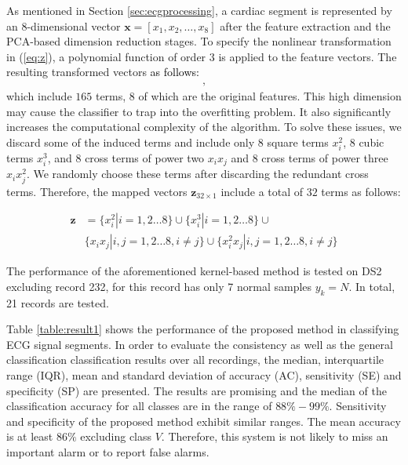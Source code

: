 As mentioned in Section \ref{sec:ecgprocessing}, a cardiac segment is represented by an 8-dimensional vector $\mathbf{x}=[x_1,x_2,\dots,x_8]$ after the feature extraction and the PCA-based dimension reduction stages. %
To specify the nonlinear transformation in (\ref{eq:z}), a polynomial function of order $3$ is applied to the feature vectors.
The resulting transformed vectors \textcolor{black}{as follows:}
\begin{align}
	[x_1,x_2,\dots,x_8,x_1^2,x_2^2,\dots,x_8^2,x_1^3,x_2^3,\dots,x_8^3,x_1x_2,....x_6x_7x_8], 
\end{align}
which include $165$ terms, 8 of which are the original features. %
This high dimension may cause the classifier to trap into the overfitting problem. It also significantly increases the computational complexity of the algorithm. To solve these issues, we discard some of the induced terms and include only 8 square terms $x_i^2$, 8 cubic terms $x_i^3$, and 8 cross terms of power two $x_ix_j$ and 8 cross terms of power three $x_i x_j^2$. We randomly choose these terms after discarding the redundant cross terms. Therefore, the mapped vectors $\mathbf{z}_{32 \times 1}$ include a total of $32$ terms as follows:

\begin{align}
\label{eq:8-32}
\mathbf{z}&=\{x_i^2|i=1,2\dots 8\}\cup\{x_i^3|i=1,2\dots 8\} \cup\\
\nonumber
& \{x_ix_j|i,j=1,2\dots 8,i\neq j\} \cup  \{  x_i^2x_j | i,j=1,2\dots 8,i\neq j \}
\end{align}

The performance of the aforementioned kernel-based method is tested on DS2 excluding record 232, for this record has only 7 normal samples $y_k=N$. In total, 21 records are tested.

Table \ref{table:result1} shows the performance of the proposed method in classifying ECG signal segments. In order to evaluate the consistency as well as the general classification classification results over all recordings, the median, interquartile range (IQR), mean and standard deviation of accuracy (AC), sensitivity (SE) and specificity (SP) are presented. The results are promising and the median of the classification accuracy for all classes are in the range of $88\%-99\%$. Sensitivity and specificity of the proposed method exhibit similar ranges. The mean accuracy is at least $86\%$ excluding class $V$. Therefore, this system is not likely to miss an important alarm or to report false alarms. 

